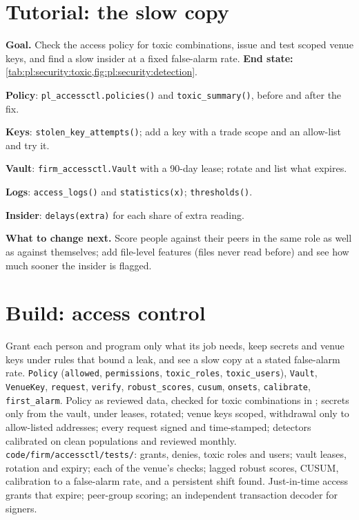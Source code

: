 \section{Tutorial: the slow copy}\label{tut:pl:security:tut}

\begin{tutorial}
\textbf{Goal.} Check the access policy for toxic combinations, issue and test scoped venue keys, and find a slow insider at a fixed false-alarm
rate. \textbf{End state:} \cref{tab:pl:security:toxic,fig:pl:security:detection}.
\begin{tutsteps}
\item \textbf{Policy}: \texttt{pl\_accessctl.policies()} and \texttt{toxic\_summary()}, before and after the fix.
\item \textbf{Keys}: \texttt{stolen\_key\_attempts()}; add a key with a trade scope and an allow-list and try it.
\item \textbf{Vault}: \texttt{firm\_accessctl.Vault} with a 90-day lease; rotate and list what expires.
\item \textbf{Logs}: \texttt{access\_logs()} and \texttt{statistics(x)}; \texttt{thresholds()}.
\item \textbf{Insider}: \texttt{delays(extra)} for each share of extra reading.
\end{tutsteps}
\textbf{What to change next.} Score people against their peers in the same role as well as against themselves; add file-level features (files
never read before) and see how much sooner the insider is flagged.
\end{tutorial}

\section{Build: access control}\label{bld:pl:security:accessctl}

\begin{build}
 Grant each person and program only what its job needs, keep secrets and venue keys under rules that bound a leak, and see a
slow copy at a stated false-alarm rate.
 \texttt{Policy} (\texttt{allowed}, \texttt{permissions}, \texttt{toxic\_roles}, \texttt{toxic\_users}), \texttt{Vault},
\texttt{VenueKey}, \texttt{request}, \texttt{verify}, \texttt{robust\_scores}, \texttt{cusum}, \texttt{onsets}, \texttt{calibrate},
\texttt{first\_alarm}.
 Policy as reviewed data, checked for toxic combinations in ; secrets only from the vault, under leases,
rotated; venue keys scoped, withdrawal only to allow-listed addresses; every request signed and time-stamped; detectors calibrated on clean
populations and reviewed monthly.
 \texttt{code/firm/accessctl/tests/}: grants, denies, toxic roles and users; vault leases, rotation and expiry; each of
the venue's checks; lagged robust scores, CUSUM, calibration to a false-alarm rate, and a persistent shift found.
 Just-in-time access grants that expire; peer-group scoring; an independent transaction decoder for signers.
\end{build}

